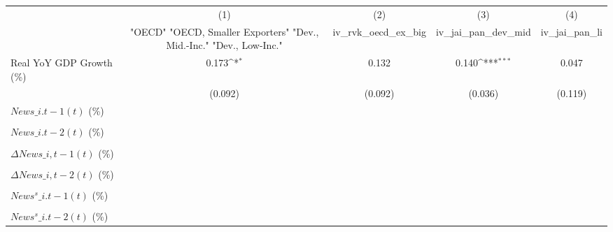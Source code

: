 {
\def\sym#1{\ifmmode^{#1}\else\(^{#1}\)\fi}
\begin{tabular}{l*{4}{c}}
\toprule
                    &\multicolumn{1}{c}{(1)}&\multicolumn{1}{c}{(2)}&\multicolumn{1}{c}{(3)}&\multicolumn{1}{c}{(4)}\\
                    &\multicolumn{1}{c}{ "OECD" "OECD, Smaller Exporters" "Dev., Mid.-Inc." "Dev., Low-Inc."}&\multicolumn{1}{c}{iv\_rvk\_oecd\_ex\_big}&\multicolumn{1}{c}{iv\_jai\_pan\_dev\_mid}&\multicolumn{1}{c}{iv\_jai\_pan\_li}\\
\midrule
Real YoY GDP Growth (\%)&       0.173\sym{*}  &       0.132         &       0.140\sym{***}&       0.047         \\
                    &     (0.092)         &     (0.092)         &     (0.036)         &     (0.119)         \\
\addlinespace
$ News\_{i.t-1}(t)$ (\%)&                     &                     &                     &                     \\
                    &                     &                     &                     &                     \\
\addlinespace
$ News\_{i.t-2}(t)$ (\%)&                     &                     &                     &                     \\
                    &                     &                     &                     &                     \\
\addlinespace
$ \Delta News\_{i,t-1}(t)$ (\%)&                     &                     &                     &                     \\
                    &                     &                     &                     &                     \\
\addlinespace
$ \Delta News\_{i,t-2}(t)$ (\%)&                     &                     &                     &                     \\
                    &                     &                     &                     &                     \\
\addlinespace
$ News^s\_{i.t-1}(t)$ (\%)&                     &                     &                     &                     \\
                    &                     &                     &                     &                     \\
\addlinespace
$ News^s\_{i.t-2}(t)$ (\%)&                     &                     &                     &                     \\

\end{tabular}}
